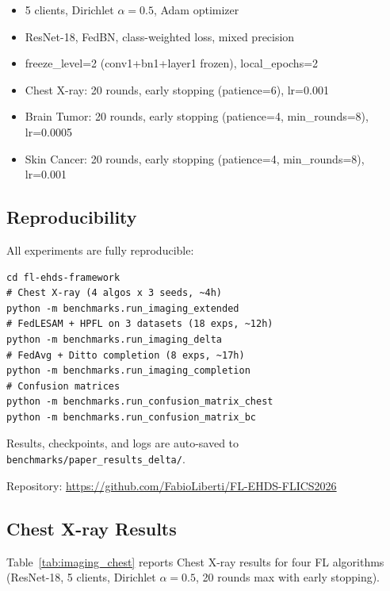 \documentclass[conference,a4paper]{IEEEtran}
\begin{document}
\begin{itemize}
    \item 5 clients, Dirichlet $\alpha{=}0.5$, Adam optimizer
    \item ResNet-18, FedBN, class-weighted loss, mixed precision
    \item freeze\_level=2 (conv1+bn1+layer1 frozen), local\_epochs=2
    \item Chest X-ray: 20 rounds, early stopping (patience=6), lr=0.001
    \item Brain Tumor: 20 rounds, early stopping (patience=4, min\_rounds=8), lr=0.0005
    \item Skin Cancer: 20 rounds, early stopping (patience=4, min\_rounds=8), lr=0.001
\end{itemize}

\subsection{Reproducibility}

All experiments are fully reproducible:
\begin{verbatim}
cd fl-ehds-framework
# Chest X-ray (4 algos x 3 seeds, ~4h)
python -m benchmarks.run_imaging_extended
# FedLESAM + HPFL on 3 datasets (18 exps, ~12h)
python -m benchmarks.run_imaging_delta
# FedAvg + Ditto completion (8 exps, ~17h)
python -m benchmarks.run_imaging_completion
# Confusion matrices
python -m benchmarks.run_confusion_matrix_chest
python -m benchmarks.run_confusion_matrix_bc
\end{verbatim}

Results, checkpoints, and logs are auto-saved to \texttt{benchmarks/paper\_results\_delta/}.

Repository: \url{https://github.com/FabioLiberti/FL-EHDS-FLICS2026}

\subsection{Chest X-ray Results}
\label{sec:imaging_results}

Table~\ref{tab:imaging_chest} reports Chest X-ray results for four FL algorithms (ResNet-18, 5 clients, Dirichlet $\alpha{=}0.5$, 20 rounds max with early stopping).
\end{document}
